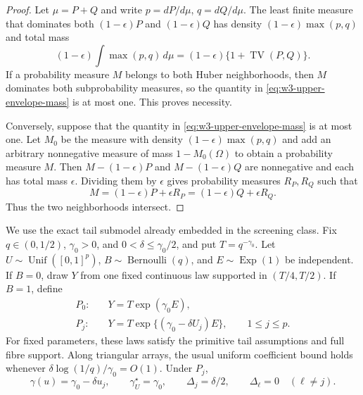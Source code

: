 \documentclass[11pt]{article}
\theoremstyle{remark}
\newcommand{\TV}{\operatorname{TV}}
\begin{document}
\begin{proof}
Let $\mu=P+Q$ and write $p=dP/d\mu$, $q=dQ/d\mu$.  The least finite measure
that dominates both $(1-\epsilon)P$ and $(1-\epsilon)Q$ has density
$(1-\epsilon)\max(p,q)$ and total mass
\begin{equation}
 (1-\epsilon)\int\max(p,q)\,d\mu
 =(1-\epsilon)\{1+\TV(P,Q)\}.
 \label{eq:w3-upper-envelope-mass}
\end{equation}
If a probability measure $M$ belongs to both Huber neighborhoods, then $M$
dominates both subprobability measures, so the quantity in
\eqref{eq:w3-upper-envelope-mass} is at most one.  This proves necessity.

Conversely, suppose that the quantity in
\eqref{eq:w3-upper-envelope-mass} is at most one.  Let $M_0$ be the measure
with density $(1-\epsilon)\max(p,q)$ and add an arbitrary nonnegative measure
of mass $1-M_0(\Omega)$ to obtain a probability measure $M$.  Then
$M-(1-\epsilon)P$ and $M-(1-\epsilon)Q$ are nonnegative and each has total mass
$\epsilon$.  Dividing them by $\epsilon$ gives probability measures $R_P,R_Q$
such that
\begin{equation*}
 M=(1-\epsilon)P+\epsilon R_P
  =(1-\epsilon)Q+\epsilon R_Q.
\end{equation*}
Thus the two neighborhoods intersect.
\end{proof}

We use the exact tail submodel already embedded in the screening class.  Fix
$q\in(0,1/2)$, $\gamma_0>0$, and $0<\delta\le\gamma_0/2$, and put
$T=q^{-\gamma_0}$.  Let $U\sim\operatorname{Unif}([0,1]^p)$,
$B\sim\operatorname{Bernoulli}(q)$, and $E\sim\operatorname{Exp}(1)$ be
independent.  If $B=0$, draw $Y$ from one fixed continuous law supported in
$(T/4,T/2)$.  If $B=1$, define
\begin{align}
 P_0:\quad&Y=T\exp(\gamma_0E),
 \label{eq:w3-submodel-null}\\
 P_j:\quad&Y=T\exp\{(\gamma_0-\delta U_j)E\},
 \qquad 1\le j\le p.
 \label{eq:w3-submodel-alt}
\end{align}
For fixed parameters, these laws satisfy the primitive tail assumptions and
full fibre support.  Along triangular arrays, the usual uniform coefficient
bound holds whenever
$\delta\log(1/q)/\gamma_0=O(1)$.  Under $P_j$,
\begin{equation}
 \gamma(u)=\gamma_0-\delta u_j,
 \qquad
 \gamma_U^\star=\gamma_0,
 \qquad
 \Delta_j=\delta/2,
 \qquad
 \Delta_\ell=0\quad(\ell\ne j).
 \label{eq:w3-submodel-gap}
\end{equation}
\end{document}
